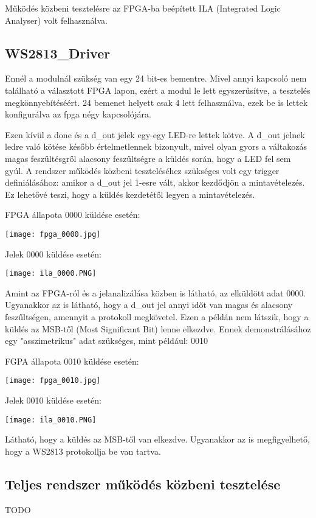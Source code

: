 Működés közbeni tesztelésre az FPGA-ba beépített ILA (Integrated Logic Analyser) volt felhasználva.

\subsection{WS2813\_Driver}

Ennél a modulnál szükség van egy 24 bit-es bementre. Mivel annyi kapcsoló nem található a választott FPGA lapon, ezért a modul le lett egyszerűsítve, a tesztelés megkönnyebítéséért. 
24 bemenet helyett csak 4 lett felhasználva, ezek be is lettek konfigurálva az fpga négy kapcsolójára.

Ezen kívül a done és a d\_out jelek egy-egy LED-re lettek kötve. A d\_out jelnek ledre való kötése később értelmetlennek bizonyult, mivel olyan gyors a váltakozás magas feszűltésgről alacsony feszűltségre
a küldés során, hogy a LED fel sem gyúl.
A rendszer működés közbeni teszteléséhez szükséges volt egy trigger definiálásához: amikor a d\_out jel 1-esre vált, akkor kezdődjön a mintavételezés. Ez lehetővé teszi, hogy a küldés kezdetétől legyen a mintavételezés.

FPGA állapota 0000 küldése esetén:

\texttt{[image: fpga\_0000.jpg]}

Jelek 0000 küldése esetén:

\texttt{[image: ila\_0000.PNG]}

Amint az FPGA-ról és a jelanalizálása közben is látható, az elküldött adat 0000. Ugyanakkor az is látható, hogy a d\_out jel annyi időt van magas és alacsony feszűltségen, amennyit a protokoll megkövetel.
Ezen a példán nem látszik, hogy a küldés az MSB-től (Most Significant Bit) lenne elkezdve. Ennek demonstrálásához egy "asszimetrikus" adat szükséges, mint például: 0010

FGPA állapota 0010 küldése esetén:

\texttt{[image: fpga\_0010.jpg]}

Jelek 0010 küldése esetén:

\texttt{[image: ila\_0010.PNG]}

Látható, hogy a küldés az MSB-től van elkezdve. Ugyanakkor az is megfigyelhető, hogy a WS2813 protokollja be van tartva.

\subsection{Teljes rendszer működés közbeni tesztelése}

TODO